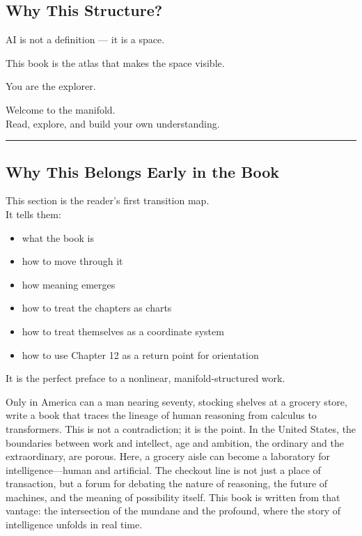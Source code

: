 \hypertarget{why-this-structure}{%
\subsection{Why This Structure?}\label{why-this-structure}}

AI is not a definition --- it is a space.

This book is the atlas that makes the space visible.

You are the explorer.

Welcome to the manifold.\\
Read, explore, and build your own understanding.

\begin{center}\rule{0.5\linewidth}{0.5pt}\end{center}

\hypertarget{why-this-belongs-early-in-the-book}{%
\subsection{Why This Belongs Early in the
Book}\label{why-this-belongs-early-in-the-book}}

This section is the reader's first transition map.\\
It tells them:

\begin{itemize}
\tightlist
\item
  what the book is
\item
  how to move through it
\item
  how meaning emerges
\item
  how to treat the chapters as charts
\item
  how to treat themselves as a coordinate system
\item
  how to use Chapter 12 as a return point for orientation
\end{itemize}

It is the perfect preface to a nonlinear, manifold‑structured work.

Only in America can a man nearing seventy, stocking shelves at a grocery
store, write a book that traces the lineage of human reasoning from
calculus to transformers. This is not a contradiction; it is the point.
In the United States, the boundaries between work and intellect, age and
ambition, the ordinary and the extraordinary, are porous. Here, a
grocery aisle can become a laboratory for intelligence---human and
artificial. The checkout line is not just a place of transaction, but a
forum for debating the nature of reasoning, the future of machines, and
the meaning of possibility itself. This book is written from that
vantage: the intersection of the mundane and the profound, where the
story of intelligence unfolds in real time.

